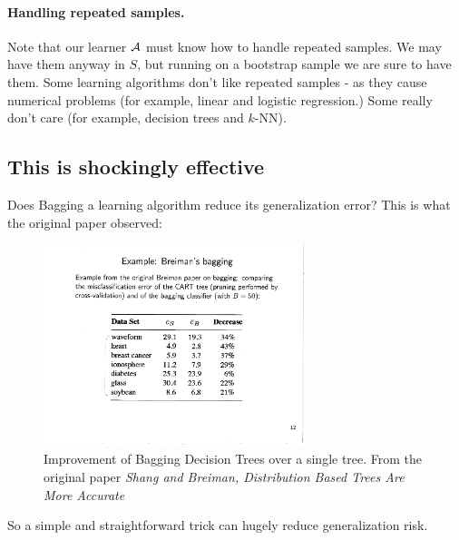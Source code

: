 \paragraph{Handling repeated samples.} 
Note that our learner $\mathcal{A}$ must know how to handle repeated samples. We may have them
anyway in $S$, but running on a bootstrap sample we are sure to have them. Some
learning algorithms don't like repeated samples - as they cause numerical
problems (for example, linear and logistic regression.) Some really don't care
(for example, decision trees and $k$-NN).


\subsection{This is shockingly effective}

Does Bagging a learning algorithm reduce its generalization error? This is what
the original paper observed:
\begin{figure}[H]
  \centering
  \includegraphics[width=3in]{breiman.pdf}
  \caption{Improvement of Bagging Decision Trees over a single tree. From the
    original paper \emph{
  Shang and Breiman,  Distribution Based Trees Are More Accurate}}
  \label{breiman}
\end{figure}

\noindent So a simple and straightforward trick can hugely reduce generalization risk.

